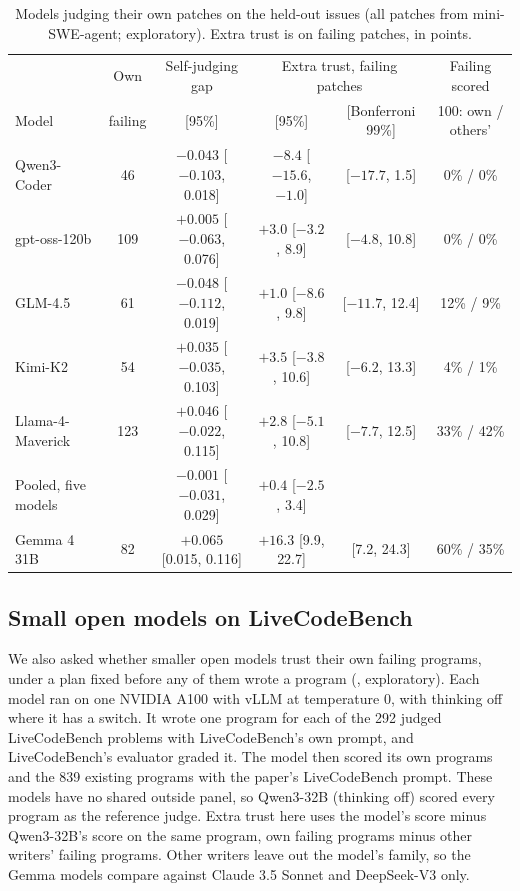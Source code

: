 \documentclass[10pt,letterpaper]{article}
\begin{document}
\begin{table}[H]
\centering
\small
\caption{Models judging their own patches on the held-out issues (all patches from mini-SWE-agent; exploratory).
Extra trust is on failing patches, in points.}
\label{tab:fiveheld}
\setlength{\tabcolsep}{3pt}
\begin{tabular}{@{}lccccc@{}}
\toprule
 & Own & Self-judging gap & \multicolumn{2}{c}{Extra trust, failing patches} & Failing scored \\
Model & failing & [95\%] & [95\%] & [Bonferroni 99\%] & 100: own / others' \\
\midrule
Qwen3-Coder & 46 & $-0.043$ [$-0.103$, 0.018] & $-8.4$ [$-15.6$, $-1.0$] & [$-17.7$, 1.5] & 0\% / 0\% \\
gpt-oss-120b & 109 & $+0.005$ [$-0.063$, 0.076] & $+3.0$ [$-3.2$, 8.9] & [$-4.8$, 10.8] & 0\% / 0\% \\
GLM-4.5 & 61 & $-0.048$ [$-0.112$, 0.019] & $+1.0$ [$-8.6$, 9.8] & [$-11.7$, 12.4] & 12\% / 9\% \\
Kimi-K2 & 54 & $+0.035$ [$-0.035$, 0.103] & $+3.5$ [$-3.8$, 10.6] & [$-6.2$, 13.3] & 4\% / 1\% \\
Llama-4-Maverick & 123 & $+0.046$ [$-0.022$, 0.115] & $+2.8$ [$-5.1$, 10.8] & [$-7.7$, 12.5] & 33\% / 42\% \\
\midrule
Pooled, five models & & $-0.001$ [$-0.031$, 0.029] & $+0.4$ [$-2.5$, 3.4] & & \\
Gemma 4 31B & 82 & $+0.065$ [0.015, 0.116] & $+16.3$ [9.9, 22.7] & [7.2, 24.3] & 60\% / 35\% \\
\bottomrule
\end{tabular}
\end{table}

\subsection*{Small open models on LiveCodeBench}

We also asked whether smaller open models trust their own failing programs, under a plan fixed before any of them wrote a program
(, exploratory). Each model ran on one NVIDIA A100 with vLLM at temperature 0, with
thinking off where it has a switch. It wrote one program for each of the 292 judged LiveCodeBench problems with
LiveCodeBench's own prompt, and LiveCodeBench's evaluator graded it. The model then scored its own programs and the
839 existing programs with the paper's LiveCodeBench prompt. These models have no shared outside panel, so Qwen3-32B
(thinking off) scored every program as the reference judge. Extra trust here uses the model's score minus Qwen3-32B's
score on the same program, own failing programs minus other writers' failing programs. Other writers leave out the
model's family, so the Gemma models compare against Claude 3.5 Sonnet and DeepSeek-V3 only.
\end{document}
